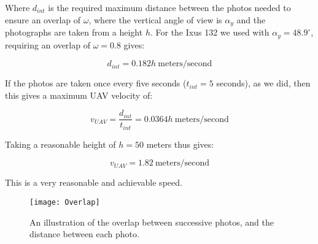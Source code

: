 Where $d_{int}$ is the required maximum distance between the photos needed to
ensure an overlap of $\omega$, where the vertical angle of view is $\alpha_y$
and the photographs are taken from a height $h$.  For the Ixus 132 we used with
$\alpha_y = 48.9^{\circ}$, requiring an overlap of $\omega = 0.8$ gives:

\begin{equation}
    d_{int} = 0.182h ~\mathrm{meters/second}
\end{equation}

If the photos are taken once every five seconds ($ t_{int} = 5 $ seconds), as we
did, then this gives a maximum UAV velocity of:

\begin{equation}
    v_{UAV} = \frac{d_{int}}{t_{int}} = 0.0364h ~\mathrm{meters/second}
\end{equation}

Taking a reasonable height of $ h = 50 $ meters thus gives:

\begin{equation}
    v_{UAV} = 1.82 ~\mathrm{meters/second}
\end{equation}

This is a very reasonable and achievable speed.

\begin{figure}
    \centering
    \texttt{[image: Overlap]}
    \caption{An illustration of the overlap between successive photos, and the
    distance between each photo.}
    \label{fig:overlap}
\end{figure}

